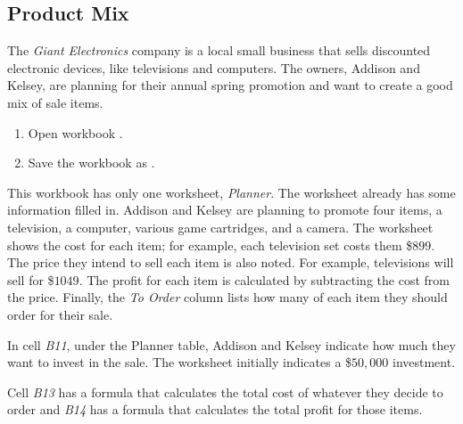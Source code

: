 \subsection{Product Mix}

The \textit{Giant Electronics} company is a local small business that sells discounted electronic devices, like televisions and computers. The owners, Addison and Kelsey, are planning for their annual spring promotion and want to create a good mix of sale items.

\begin{enumbox}
	\begin{enumerate}
		\item Open workbook .
		\item Save the workbook as .
	\end{enumerate}
\end{enumbox}

This workbook has only one worksheet, \textit{Planner}. The worksheet already has some information filled in. Addison and Kelsey are planning to promote four items, a television, a computer, various game cartridges, and a camera. The worksheet shows the cost for each item; for example, each television set costs them \$$ 899 $. The price they intend to sell each item is also noted. For example, televisions will sell for \$$ 1049 $. The profit for each item is calculated by subtracting the cost from the price. Finally, the \textit{To Order} column lists how many of each item they should order for their sale.

In cell \textit{B11}, under the Planner table, Addison and Kelsey indicate how much they want to invest in the sale. The worksheet initially indicates a \$$ 50,000 $ investment.

Cell \textit{B13} has a formula that calculates the total cost of whatever they decide to order and \textit{B14} has a formula that calculates the total profit for those items.

